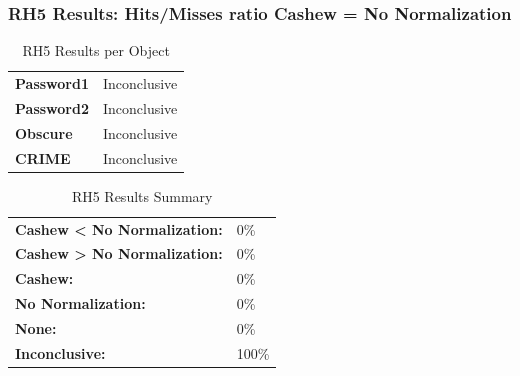 \documentclass{article}\usepackage[]{graphicx}\usepackage[]{color}
\begin{document}
	
	\subsubsection{RH5 Results: Hits/Misses ratio Cashew = No Normalization}
	
	
	\begin{table}[H]
	\centering
	\caption{RH5 Results per Object}
	\begin{tabular}{ll}
	\textbf{Password1} & Inconclusive \\
	\textbf{Password2} & Inconclusive \\
	\textbf{Obscure} & Inconclusive \\
	\textbf{CRIME} & Inconclusive \\
	\end{tabular}
	\end{table}

	\begin{table}[H]
	\centering
	\caption{RH5 Results Summary}
	\begin{tabular}{ll}
	\textbf{Cashew \textless{} No Normalization:}& 0\% \\
	\textbf{Cashew \textgreater{} No Normalization:}& 0\%\\
	\textbf{Cashew:} & 0\%\\
	\textbf{No Normalization:} & 0\%\\
	\textbf{None:}& 0\%\\
	\textbf{Inconclusive:}& 100\%
			
	
	\end{tabular}
	\end{table}
	
	
	
		


	
\clearpage
\appendix
\end{document}
